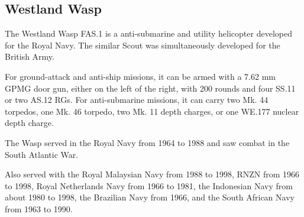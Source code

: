 \subsection{Westland Wasp}

The Westland Wasp FAS.1 is a anti-submarine and utility helicopter developed for the Royal Navy. The similar Scout was simultaneously developed for the British Army.

For ground-attack and anti-ship missions, it can be armed with a 7.62 mm GPMG door gun, either on the left of the right, with 200 rounds and four SS.11 or two AS.12 RGs. For anti-submarine missions, it can carry two Mk. 44 torpedos, one Mk. 46 torpedo, two Mk. 11 depth charges, or one WE.177 nuclear depth charge.

The Wasp served in the Royal Navy from 1964 to 1988 and saw combat in the South Atlantic War.

Also served with the Royal Malaysian Navy from 1988 to 1998, RNZN from 1966 to 1998, Royal Netherlands Navy from 1966 to 1981, the Indonesian Navy from about 1980 to 1998, the Brazilian Navy from 1966, and the South African Navy from 1963 to 1990.
